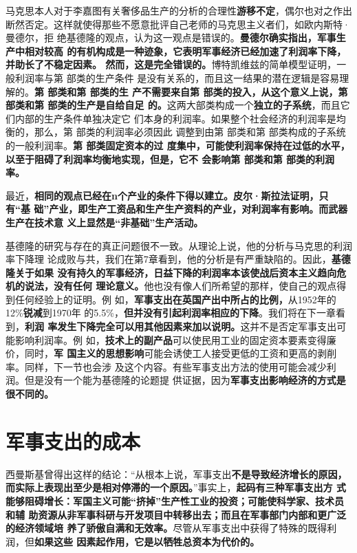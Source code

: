 马克思本人对于李嘉图有关奢侈品生产的分析的合理性\textbf{游移不定}，偶尔也对之作出
断然否定。这样就使得那些不愿意批评自己老师的马克思主义者们，如欧内斯特·曼德尔，拒
绝基德隆的观点，认为这一观点是错误的。\textbf{曼德尔确实指出，军事生产中相对较高
  的有机构成是一种迹象，它表明军事经济已经加速了利润率下降，并助长了不稳定因素。
  然而，这是完全错误的。}博特凯维兹的简单模型证明，一般利润率与第 部类的生产条件
是没有关系的，而且这一结果的潜在逻辑是容易理解的。\textbf{第 部类和第 部类的生
  产不需要来自第 部类的投入，从这个意义上说，第 部类和第 部类的生产是自给自足
  的。}这两大部类构成一个\textbf{独立的子系统}，而且它们内部的生产条件单独决定它
们本身的利润率。如果整个社会经济的利润率是均衡的，那么，第 部类的利润率必须因此
调整到由第 部类和第 部类构成的子系统的一般利润率。\textbf{第 部类固定资本的过
  度集中，可能使利润率保持在过低的水平，以至于阻碍了利润率均衡地实现，但是，它不
  会影响第 部类和第 部类的利润率。}

最近，\textbf{相同的观点已经在n个产业的条件下得以建立。皮尔·斯拉法证明，只有“基
  础”产业，即生产工资品和生产生产资料的产业，对利润率有影响。而武器生产在技术意
  义上显然是“非基础”生产活动。}

基德隆的研究与存在的真正问题很不一致。从理论上说，他的分析与马克思的利润率下降理
论成败与共，我们在第7章看到，他的分析是有严重缺陷的。因此，\textbf{基德隆关于如果
  没有持久的军事经济，日益下降的利润率本该使战后资本主义趋向危机的说法，没有任何
  理论意义。}他也没有像人们所希望的那样，使自己的观点得到任何经验上的证明。例
如，\textbf{军事支出在英国产出中所占的比例，}从1952年的12\%\textbf{锐减}到1970年
的5.5\%，\textbf{但并没有引起利润率相应的下降}。我们将在下一章看到，\textbf{利润
  率发生下降完全可以用其他因素来加以说明。}这并不是否定军事支出可能影响利润率。例
如，\textbf{技术上的副产品}可以使民用工业的固定资本要素变得廉价，同时，\textbf{军
  国主义的思想影响}可能会诱使工人接受更低的工资和更高的剥削率。同样，下一节也会涉
及这个内容。有些军事支出方法的使用可能会减少利润。但是没有一个能为基德隆的论题提
供证据，因为\textbf{军事支出影响经济的方式是很不同的。}

\section{军事支出的成本}
西曼斯基曾得出这样的结论：“从根本上说，军事支出\textbf{不是导致经济增长的原因，
  而实际上表现出至少是相对停滞的一个原因。}”事实上，\textbf{起码有三种军事支出方
  式能够阻碍增长：军国主义可能“挤掉”生产性工业的投资；可能使科学家、技术员和辅
  助资源从非军事科研与开发项目中转移出去；而且在军事部门内部和更广泛的经济领域培
  养了骄傲自满和无效率。}尽管从军事支出中获得了特殊的既得利润，但\textbf{如果这些
  因素起作用，它是以牺牲总资本为代价的。}

